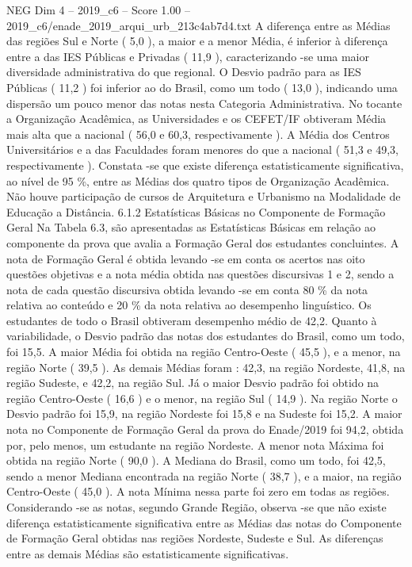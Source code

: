 \begin{textsample}{NEG Dim 4 – 2019\_c6 – Score 1.00 – 2019\_c6/enade\_2019\_arqui\_urb\_213c4ab7d4.txt}
A diferença entre as Médias das regiões Sul e Norte ( 5,0 ), a maior e a menor Média, é inferior à diferença entre a das IES Públicas e Privadas ( 11,9 ), caracterizando -se uma maior diversidade administrativa do que regional.
O Desvio padrão para as IES Públicas ( 11,2 ) foi inferior ao do Brasil, como um todo ( 13,0 ), indicando uma dispersão um pouco menor das notas nesta Categoria Administrativa.
No tocante a Organização Acadêmica, as Universidades e os CEFET/IF obtiveram Média mais alta que a nacional ( 56,0 e 60,3, respectivamente ).
A Média dos Centros Universitários e a das Faculdades foram menores do que a nacional ( 51,3 e 49,3, respectivamente ).
Constata -se que existe diferença estatisticamente significativa, ao nível de 95 \%, entre as Médias dos quatro tipos de Organização Acadêmica.
Não houve participação de cursos de Arquitetura e Urbanismo na Modalidade de Educação a Distância. 6.1.2 Estatísticas Básicas no Componente de Formação Geral Na Tabela 6.3, são apresentadas as Estatísticas Básicas em relação ao componente da prova que avalia a Formação Geral dos estudantes concluintes.
A nota de Formação Geral é obtida levando -se em conta os acertos nas oito questões objetivas e a nota média obtida nas questões discursivas 1 e 2, sendo a nota de cada questão discursiva obtida levando -se em conta 80 \% da nota relativa ao conteúdo e 20 \% da nota relativa ao desempenho linguístico.
Os estudantes de todo o Brasil obtiveram desempenho médio de 42,2.
Quanto à variabilidade, o Desvio padrão das notas dos estudantes do Brasil, como um todo, foi 15,5.
A maior Média foi obtida na região Centro-Oeste ( 45,5 ), e a menor, na região Norte ( 39,5 ).
As demais Médias foram : 42,3, na região Nordeste, 41,8, na região Sudeste, e 42,2, na região Sul.
Já o maior Desvio padrão foi obtido na região Centro-Oeste ( 16,6 ) e o menor, na região Sul ( 14,9 ).
Na região Norte o Desvio padrão foi 15,9, na região Nordeste foi 15,8 e na Sudeste foi 15,2.
A maior nota no Componente de Formação Geral da prova do Enade/2019 foi 94,2, obtida por, pelo menos, um estudante na região Nordeste.
A menor nota Máxima foi obtida na região Norte ( 90,0 ).
A Mediana do Brasil, como um todo, foi 42,5, sendo a menor Mediana encontrada na região Norte ( 38,7 ), e a maior, na região Centro-Oeste ( 45,0 ).
A nota Mínima nessa parte foi zero em todas as regiões.
Considerando -se as notas, segundo Grande Região, observa -se que não existe diferença estatisticamente significativa entre as Médias das notas do Componente de Formação Geral obtidas nas regiões Nordeste, Sudeste e Sul.
As diferenças entre as demais Médias são estatisticamente significativas.

\end{textsample}

